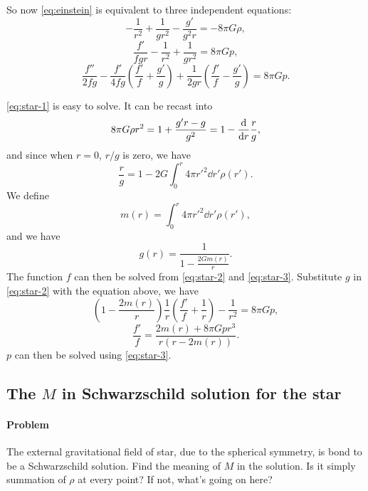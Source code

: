 \documentclass[hyperref, a4paper]{article}
\begin{document}
So now \eqref{eq:einstein} is equivalent to three independent equations:
\begin{equation}
    - \frac{1}{r^2} + \frac{1}{g r^2} - \frac{g'}{g^2 r} = - 8 \pi G \rho,
    \label{eq:star-1}
\end{equation}
\begin{equation}
    \frac{f'}{fgr} - \frac{1}{r^2} + \frac{1}{g r^2} = 8 \pi G p, 
    \label{eq:star-2}
\end{equation}
\begin{equation}
    \frac{f''}{2 f g} - \frac{f'}{4 f g} \left(\frac{f'}{f} + \frac{g'}{g}\right) + \frac{1}{2 g r} \left( \frac{f'}{f} - \frac{g'}{g} \right) = 8 \pi G p.
    \label{eq:star-3}
\end{equation}

\eqref{eq:star-1} is easy to solve. It can be recast into 
\[
    8 \pi G \rho r^2 = 1 + \frac{g' r - g}{g^2} = 1 - \dv{r} \frac{r}{g},
\]
and since when $r = 0$, $r / g$ is zero, we have 
\[
    \frac{r}{g} = 1 - 2G \int_0^r 4 \pi r'^2 \dd{r'} \rho(r').
\]
We define 
\begin{equation}
    m(r) = \int_0^r 4 \pi r'^2 \dd{r'} \rho(r'),
\end{equation}
and we have 
\begin{equation}
    g(r) = \frac{1}{1 - \frac{2 G m(r)}{r}}.
\end{equation}
The function $f$ can then be solved from \eqref{eq:star-2} and \eqref{eq:star-3}. Substitute $g$ in \eqref{eq:star-2} with the equation above, we have 
\[
    \left( 1 - \frac{2 m(r)}{r} \right) \frac{1}{r} \left( \frac{f'}{f} + \frac{1}{r} \right) - \frac{1}{r^2} = 8 \pi G p,
\]
\begin{equation}
    \frac{f'}{f} = \frac{2 m(r) + 8 \pi G p r^3}{r (r - 2 m(r))}.
    \label{eq:f-eq-1}
\end{equation}
$p$ can then be solved using \eqref{eq:star-3}.

\subsection{The $M$ in Schwarzschild solution for the star}

\paragraph{Problem} The external gravitational field of star, due to the spherical symmetry, is bond to be 
a Schwarzschild solution. Find the meaning of $M$ in the solution. Is it simply summation of $\rho$ at every point?
If not, what's going on here?
\end{document}
